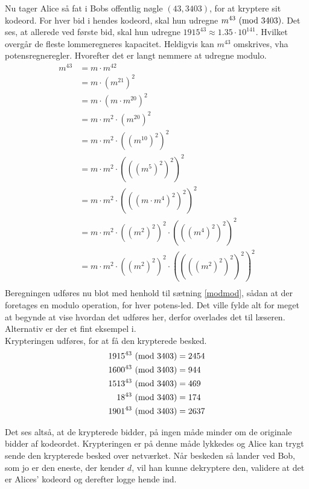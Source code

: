 Nu tager Alice så fat i Bobs offentlig nøgle \((43, 3403)\), for at kryptere sit kodeord.
For hver bid i hendes kodeord, skal hun udregne \(m^{43} \ (\mathrm{mod}\ 3403)\).
Det ses, at allerede ved første bid, skal hun udregne \(1915^{43} \approx 1.35 \cdot 10^{141}\).
Hvilket overgår de fleste lommeregneres kapacitet.
Heldigvis kan \(m^{43}\) omskrives, vha potensregneregler. Hvorefter det er langt nemmere at udregne modulo.
\begin{align*}
m^{43} &= m \cdot m^{42}\\
       &= m \cdot (m^{21})^2\\
       &= m \cdot (m \cdot m^{20})^2\\
       &= m \cdot m^2 \cdot (m^{20})^2\\
       &= m \cdot m^2 \cdot ((m^{10})^2)^2\\
       &= m \cdot m^2 \cdot (((m^5)^2)^2)^2\\
       &= m \cdot m^2 \cdot (((m \cdot m^4)^2)^2)^2\\
       &= m \cdot m^2 \cdot ((m^2)^2)^2 \cdot (((m^4)^2)^2)^2\\
       &= m \cdot m^2 \cdot ((m^2)^2)^2 \cdot ((((m^2)^2)^2)^2)^2\\
\end{align*}
Beregningen udføres nu blot med henhold til sætning \ref{modmod}, sådan at der foretages en modulo operation, for hver potens-led.
Det ville fylde alt for meget at begynde at vise hvordan det udføres her, derfor overlades det til læseren. Alternativ er der et fint eksempel i. \cite[104]{krypto}\\

Krypteringen udføres, for at få den krypterede besked.
\begin{align*}
    1915^{43} \ (\mathrm{mod}\ 3403) &= 2454\\
    1600^{43} \ (\mathrm{mod}\ 3403) &= 944\\
    1513^{43} \ (\mathrm{mod}\ 3403) &= 469\\
    18^{43} \ (\mathrm{mod}\ 3403)   &= 174\\
    1901^{43} \ (\mathrm{mod}\ 3403) &= 2637\\
\end{align*}

Det ses altså, at de krypterede bidder, på ingen måde minder om de originale bidder af kodeordet.
Krypteringen er på denne måde lykkedes og Alice kan trygt sende den krypterede besked over netværket.
Når beskeden så lander ved Bob, som jo er den eneste, der kender \(d\), vil han kunne dekryptere den, validere at det er Alices' kodeord og derefter logge hende ind.

